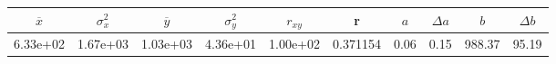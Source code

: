 \begin{tabular}{cccccccccc}
\toprule
$\overline{x}$ & $\sigma_x^2$ & $\overline{y}$ & $\sigma_y^2$ & $r_{xy}$ & r & $a$ & $\Delta a$ & $b$ & $\Delta b$ \\
\midrule
6.33e+02 & 1.67e+03 & 1.03e+03 & 4.36e+01 & 1.00e+02 & 0.371154 & 0.06 & 0.15 & 988.37 & 95.19 \\
\bottomrule
\end{tabular}
